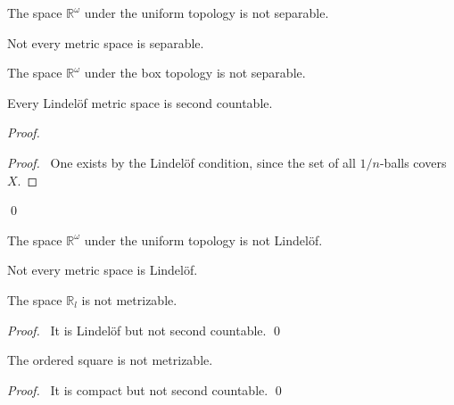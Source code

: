 \begin{cor}
  The space $\mathbb{R}^\omega$ under the uniform topology is not separable.
\end{cor}

\begin{cor}
  Not every metric space is separable.
\end{cor}

\begin{cor}
The space $\mathbb{R}^\omega$ under the box topology is not separable.
\end{cor}
  \begin{prop}[CC]
    \label{prop:topology:metric:Lindelof_second_countable}
  Every Lindel\"{o}f metric space is second countable.
\end{prop}

\begin{proof}
 \pf
 \begin{proof}
   \pf\ One exists by the Lindel\"{o}f condition, since the set of all
$1/n$-balls covers $X$.
 \end{proof}
  \qed
\end{proof}

\begin{cor}
  The space $\mathbb{R}^\omega$ under the uniform topology is not
Lindel\"{o}f.
\end{cor}

\begin{cor}
Not every metric space is Lindel\"{o}f.
\end{cor}

\begin{prop}
  The space $\mathbb{R}_l$ is not metrizable.
\end{prop}

\begin{proof}
  \pf\ It is Lindel\"{o}f but not second countable. \qed
\end{proof}

  \begin{prop}
 The ordered square is not metrizable.
\end{prop}

\begin{proof}
 \pf\ It is compact but not second countable. \qed
\end{proof}

